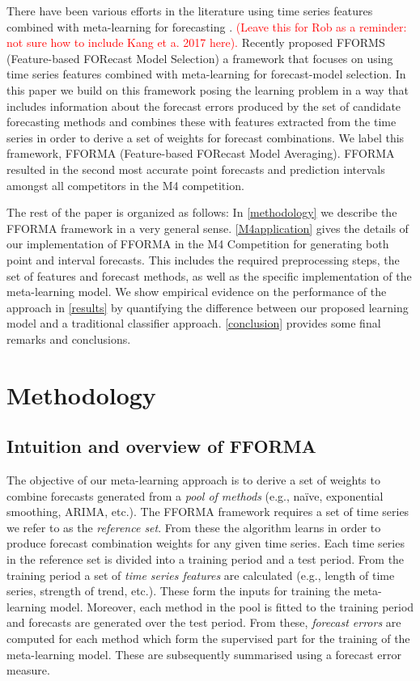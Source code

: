 \documentclass[11pt,a4paper,]{article}
\def\naive{na\"{i}ve}
\theoremstyle{definition}
\theoremstyle{definition}
\theoremstyle{definition}
\theoremstyle{remark}
\begin{document}
There have been various efforts in the literature using time series
features combined with meta-learning for forecasting \autocites[see for
example][]{prudencio2004using}{LEMKE20102006}{KucEtAl2016}.
\textcolor{red}{(Leave this for Rob as a reminder: not sure how to include Kang et a. 2017 here).}
Recently \textcite{fforms} proposed FFORMS (Feature-based FORecast Model
Selection) a framework that focuses on using time series features
combined with meta-learning for forecast-model selection. In this paper
we build on this framework posing the learning problem in a way that
includes information about the forecast errors produced by the set of
candidate forecasting methods and combines these with features extracted
from the time series in order to derive a set of weights for forecast
combinations. We label this framework, FFORMA (Feature-based FORecast
Model Averaging). FFORMA resulted in the second most accurate point
forecasts and prediction intervals amongst all competitors in the M4
competition.

The rest of the paper is organized as follows: In \autoref{methodology}
we describe the FFORMA framework in a very general sense.
\autoref{M4application} gives the details of our implementation of
FFORMA in the M4 Competition for generating both point and interval
forecasts. This includes the required preprocessing steps, the set of
features and forecast methods, as well as the specific implementation of
the meta-learning model. We show empirical evidence on the performance
of the approach in \autoref{results} by quantifying the difference
between our proposed learning model and a traditional classifier
approach. \autoref{conclusion} provides some final remarks and
conclusions.

\section{Methodology}\label{methodology}

\subsection{Intuition and overview of
FFORMA}\label{intuition-and-overview-of-fforma}

The objective of our meta-learning approach is to derive a set of
weights to combine forecasts generated from a \emph{pool of methods}
(e.g., \naive, exponential smoothing, ARIMA, etc.). The FFORMA framework
requires a set of time series we refer to as the \emph{reference set}.
From these the algorithm learns in order to produce forecast combination
weights for any given time series. Each time series in the reference set
is divided into a training period and a test period. From the training
period a set of \emph{time series features} are calculated (e.g., length
of time series, strength of trend, etc.). These form the inputs for
training the meta-learning model. Moreover, each method in the pool is
fitted to the training period and forecasts are generated over the test
period. From these, \emph{forecast errors} are computed for each method
which form the supervised part for the training of the meta-learning
model. These are subsequently summarised using a forecast error measure.
\end{document}
